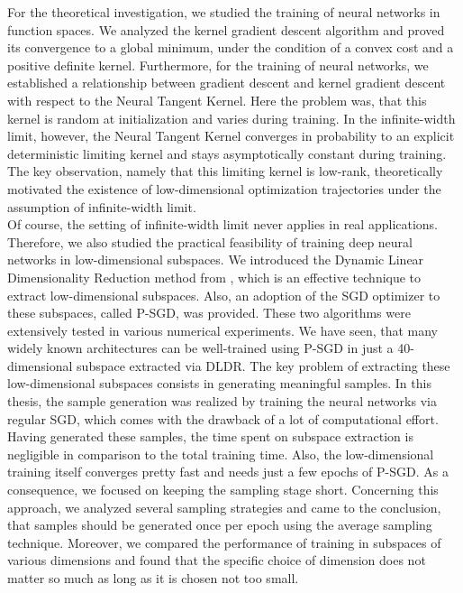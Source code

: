 \documentclass[11pt, a4paper]{article}
\begin{document}
For the theoretical investigation, we studied the training of neural networks in function spaces. We analyzed the kernel gradient descent algorithm and proved its convergence to a global minimum, under the condition of a convex cost and a positive definite kernel. Furthermore, for the training of neural networks, we established a relationship between gradient descent and kernel gradient descent with respect to the Neural Tangent Kernel. Here the problem was, that this kernel is random at initialization and varies during training. In the infinite-width limit, however, the Neural Tangent Kernel converges in probability to an explicit deterministic limiting kernel and stays asymptotically constant during training. The key observation, namely that this limiting kernel is low-rank, theoretically motivated the existence of low-dimensional optimization trajectories under the assumption of infinite-width limit. \\

Of course, the setting of infinite-width limit never applies in real applications. Therefore, we also studied the practical feasibility of training deep neural networks in low-dimensional subspaces. We introduced the Dynamic Linear Dimensionality Reduction method from \cite{Paper}, which is an effective technique to extract low-dimensional subspaces. Also, an adoption of the SGD optimizer to these subspaces, called P-SGD, was provided. These two algorithms were extensively tested in various numerical experiments. We have seen, that many widely known architectures can be well-trained using P-SGD in just a 40-dimensional subspace extracted via DLDR. The key problem of extracting these low-dimensional subspaces consists in generating meaningful samples. In this thesis, the sample generation was realized by training the neural networks via regular SGD, which comes with the drawback of a lot of computational effort. Having generated these samples, the time spent on subspace extraction is negligible in comparison to the total training time. Also, the low-dimensional training itself converges pretty fast and needs just a few epochs of P-SGD. As a consequence, we focused on keeping the sampling stage short. Concerning this approach, we analyzed several sampling strategies and came to the conclusion, that samples should be generated once per epoch using the average sampling technique. Moreover, we compared the performance of training in subspaces of various dimensions and found that the specific choice of dimension does not matter so much as long as it is chosen not too small. \\
\end{document}
